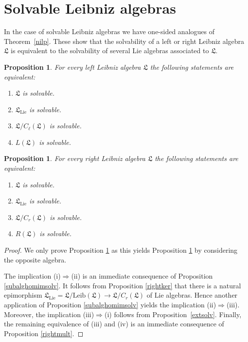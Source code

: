 \documentclass{amsart}
\newtheorem{pro}[thm]{Proposition}
\numberwithin{equation}{section}
\newcommand{\lie}{\mathrm{Lie}}
\newcommand{\leib}{\mathrm{Leib}}
\newcommand{\lf}{\mathfrak{L}}
\begin{document}

\section{Solvable Leibniz algebras}


In the case of solvable Leibniz algebras we have one-sided analogues of Theorem~\ref{nilp}.
These show that the solvability of a left or right Leibniz algebra $\lf$ is equivalent to the
solvability of several Lie algebras associated to $\lf$.

\begin{pro}\label{leftsolv}
For every left Leibniz algebra $\lf$ the following statements are equivalent:
\begin{enumerate}
\item[(i)]   $\lf$ is solvable.
\item[(ii)]  $\lf_\lie$ is solvable.
\item[(iii)] $\lf/C_\ell(\lf)$ is solvable.
\item[(iv)] $L(\lf)$ is solvable.
\end{enumerate}
\end{pro}

\begin{pro}\label{rightsolv}
For every right Leibniz algebra $\lf$ the following statements are equivalent:
\begin{enumerate}
\item[(i)]   $\lf$ is solvable.
\item[(ii)]  $\lf_\lie$ is solvable.
\item[(iii)] $\lf/C_r(\lf)$ is solvable.
\item[(iv)] $R(\lf)$ is solvable.
\end{enumerate}
\end{pro}

\begin{proof}
We only prove Proposition \ref{rightsolv} as this yields Proposition \ref{leftsolv} by considering the
opposite algebra.

The implication (i)$\Rightarrow$(ii) is an immediate consequence of Proposition \ref{subalghomimsolv}.
It follows from Proposition \ref{rightker} that there is a natural epimorphism $\lf_\lie=\lf/\leib(\lf)\to
\lf/C_r(\lf)$ of Lie algebras. Hence another application of Proposition \ref{subalghomimsolv} yields
the implication (ii)$\Rightarrow$(iii). Moreover, the implication (iii)$\Rightarrow$(i) follows from
Proposition~\ref{extsolv}. Finally, the remaining equivalence of (iii) and (iv) is an immediate
consequence of Proposition \ref{rightmult}.
\end{proof}
\end{document}
